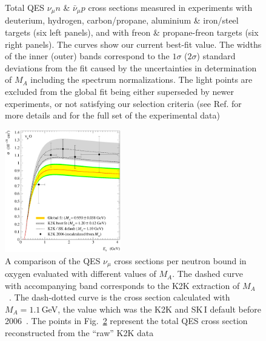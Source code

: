 \begin{figure}[h!]
\begin{center}
\caption{\label{TotalCS}Total QES $\nu_{\mu}n$ \& $\bar\nu_{\mu}p$ cross sections measured in experiments with deuterium, hydrogen, carbon/propane, aluminium \& iron/steel targets (six left panels), and with freon \& propane-freon targets (six right panels). The curves show our current best-fit value. The widths of the inner (outer) bands correspond to the $1\sigma$ ($2\sigma$) standard deviations from the fit caused by the uncertainties in determination of $M_A$ including the spectrum normalizations. The light points are excluded from the global fit being either superseded by newer experiments, or not satisfying our selection criteria (see Ref.\cite{Kuzmin:2007kr} for more details and for the full set of the experimental data)}
\end{center}
\end{figure}

\begin{figure}[h!]
\begin{center}
\includegraphics[width=0.45\textwidth]{./QES/sQESCC_K2K06_101.3.00.301.00_2_BBBA25_SM.eps}
\caption{\label{K2K}A comparison of the QES $\nu_{\mu}$ cross sections per neutron bound in oxygen evaluated with different values of $M_A$. The dashed curve with accompanying band corresponds to the K2K extraction of $M_A$~\cite{Gran:2006jn}. The dash-dotted curve is the cross section calculated with $M_A=1.1$\,GeV, the value which was the K2K and SK\,I default before 2006~\cite{Gran:2006jn,Ashie:2005ik}. The points in Fig.~\ref{K2K} represent the total QES cross section reconstructed from the ``raw'' K2K data}
\end{center}
\end{figure}

